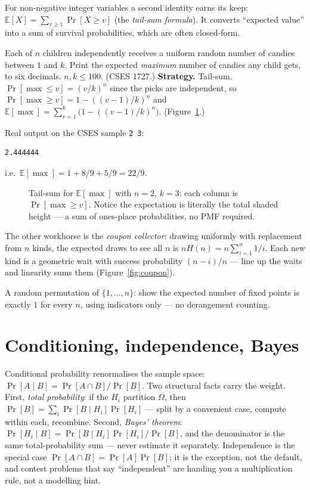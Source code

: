 For non-negative integer variables a second identity earns its
keep: $\mathbb{E}[X]=\sum_{v\ge1}\Pr[X\ge v]$ (the \emph{tail-sum
formula}). It converts ``expected
value'' into a sum of survival probabilities, which are often
closed-form.

\begin{example}
Each of $n$ children independently receives a uniform random
number of candies between $1$ and $k$. Print the expected
\emph{maximum} number of candies any child gets, to six
decimals. $n,k\le 100$. (CSES 1727.)
\textbf{Strategy.} Tail-sum. $\Pr[\max\le v]=(v/k)^n$ since the
picks are independent, so $\Pr[\max\ge v]=1-((v-1)/k)^n$ and
$\mathbb{E}[\max]=\sum_{v=1}^{k}\bigl(1-((v-1)/k)^n\bigr)$.
(Figure~\ref{fig:tailsum}.)
\end{example}
\begin{solution}

Real output on the CSES sample \texttt{2 3}:
\begin{verbatim}
2.444444
\end{verbatim}
i.e.\ $\mathbb{E}[\max]=1+8/9+5/9=22/9$.
\end{solution}
\begin{figure}[ht]\centering

\caption{Tail-sum for $\mathbb{E}[\max]$ with $n=2$, $k=3$: each column
is $\Pr[\max\ge v]$. Notice the expectation is literally the
total shaded height --- a sum of ones-place probabilities, no
PMF required.}
\label{fig:tailsum}
\end{figure}

The other workhorse is the \emph{coupon
collector}: drawing uniformly
with replacement from $n$ kinds, the expected draws to see all
$n$ is $nH(n)=n\sum_{i=1}^{n}1/i$. Each new kind is a geometric
wait with success probability $(n-i)/n$ --- line up the waits
and linearity sums them (Figure~\ref{fig:coupon}).

\begin{exercise}[medium] A random permutation of
$\{1,\dots,n\}$: show the expected number of fixed points is
exactly $1$ for every $n$, using indicators only --- no
derangement counting.\end{exercise}

\section{Conditioning, independence, Bayes}\label{sec:bayes}
Conditional probability renormalises the sample space:
$\Pr[A\mid B]=\Pr[A\cap B]/\Pr[B]$. Two structural facts carry
the weight. First, \emph{total probability}: if the $H_i$
partition $\Omega$, then
$\Pr[B]=\sum_i\Pr[B\mid H_i]\Pr[H_i]$ --- split by a
convenient case, compute within each, recombine. Second,
\emph{Bayes' theorem}:
$\Pr[H_i\mid B]=\Pr[B\mid H_i]\Pr[H_i]/\Pr[B]$, and the
denominator is the same total-probability sum --- never
estimate it separately. Independence is the special case
$\Pr[A\cap B]=\Pr[A]\Pr[B]$; it is the exception, not the
default, and contest problems that say ``independent'' are
handing you a multiplication rule, not a modelling hint.

